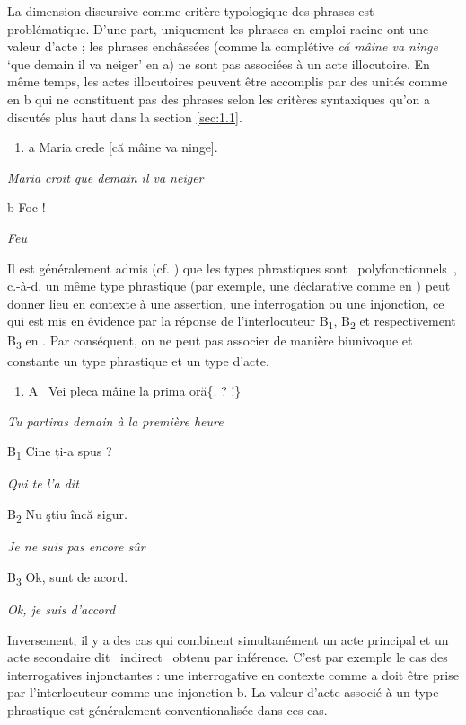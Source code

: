 La dimension discursive comme critère typologique des phrases est problématique. D'une part, uniquement les phrases en emploi racine ont une valeur d'acte ; les phrases enchâssées (comme la complétive \textit{că mâine va ninge} `que demain il va neiger' en a) ne sont pas associées à un acte illocutoire. En même temps, les actes illocutoires peuvent être accomplis par des unités comme en b qui ne constituent pas des phrases selon les critères syntaxiques qu'on a discutés plus haut dans la section \ref{sec:1.1}. 


\begin{enumerate}
\item \label{bkm:Ref299093531}a  Maria crede [că mâine va ninge].


\end{enumerate}
{\itshape
Maria croit que demain il va neiger}

  b  Foc !

{\itshape
Feu}

Il est généralement admis (cf. \citet{Gazdar1981}) que les types phrastiques sont {\guillemotleft}~polyfonctionnels~{\guillemotright}, c.-à-d. un même type phrastique (par exemple, une déclarative comme en ) peut donner lieu en contexte à une assertion, une interrogation ou une injonction, ce qui est mis en évidence par la réponse de l'interlocuteur B\textsubscript{1}, B\textsubscript{2} et respectivement B\textsubscript{3} en . Par conséquent, on ne peut pas associer de manière biunivoque et constante un type phrastique et un type d'acte. 


\begin{enumerate}
\item \label{bkm:Ref299093669}\label{bkm:Ref299093611}A~  Vei pleca mâine la prima oră\{. {\textbar} ? {\textbar} !\}


\end{enumerate}
{\itshape
Tu partiras demain à la première heure}

  B\textsubscript{1 } Cine ți-a spus ?

{\itshape
Qui te l'a dit}

  B\textsubscript{2}  Nu ştiu încă sigur.

{\itshape
Je ne suis pas encore sûr}

  B\textsubscript{3}  Ok, sunt de acord.

{\itshape
Ok, je suis d'accord}

Inversement, il y a des cas qui combinent simultanément un acte principal et un acte secondaire dit {\guillemotleft}~indirect~{\guillemotright} obtenu par inférence. C'est par exemple le cas des interrogatives injonctantes : une interrogative en contexte comme a doit être prise par l'interlocuteur comme une injonction b. La valeur d'acte associé à un type phrastique est généralement conventionalisée dans ces cas.


